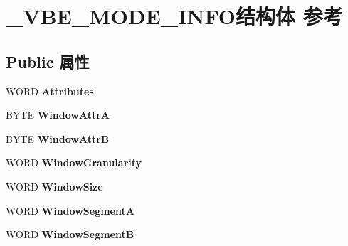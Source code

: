 \hypertarget{struct___v_b_e___m_o_d_e___i_n_f_o}{}\section{\+\_\+\+V\+B\+E\+\_\+\+M\+O\+D\+E\+\_\+\+I\+N\+F\+O结构体 参考}
\label{struct___v_b_e___m_o_d_e___i_n_f_o}
\subsection*{Public 属性}
\begin{DoxyCompactItemize}
\item 
\mbox{\label{struct___v_b_e___m_o_d_e___i_n_f_o_aad4d24da937b9dcd64cb128e599ce5fb}} 
W\+O\+RD {\bfseries Attributes}
\item 
\mbox{\label{struct___v_b_e___m_o_d_e___i_n_f_o_addac2b14821ba0ff59506580365ece5c}} 
B\+Y\+TE {\bfseries Window\+AttrA}
\item 
\mbox{\label{struct___v_b_e___m_o_d_e___i_n_f_o_a5d17ed8736cd6dcc5132906a17a51954}} 
B\+Y\+TE {\bfseries Window\+AttrB}
\item 
\mbox{\label{struct___v_b_e___m_o_d_e___i_n_f_o_a16fb276ecf6bd39fc7415c329c0e1bf0}} 
W\+O\+RD {\bfseries Window\+Granularity}
\item 
\mbox{\label{struct___v_b_e___m_o_d_e___i_n_f_o_a818a93b926175c7505c1860e5c5ecbfb}} 
W\+O\+RD {\bfseries Window\+Size}
\item 
\mbox{\label{struct___v_b_e___m_o_d_e___i_n_f_o_a24ade1869691309f3e528cb7d546cd0b}} 
W\+O\+RD {\bfseries Window\+SegmentA}
\item 
\mbox{\label{struct___v_b_e___m_o_d_e___i_n_f_o_ad2c59548266060a1c9a3b092f7669bd4}} 
W\+O\+RD {\bfseries Window\+SegmentB}
\item 
\mbox{\label{struct___v_b_e___m_o_d_e___i_n_f_o_ae88a23bb33f00ef7fbaccf1d89adcd03}} 

\end{DoxyCompactItemize}
